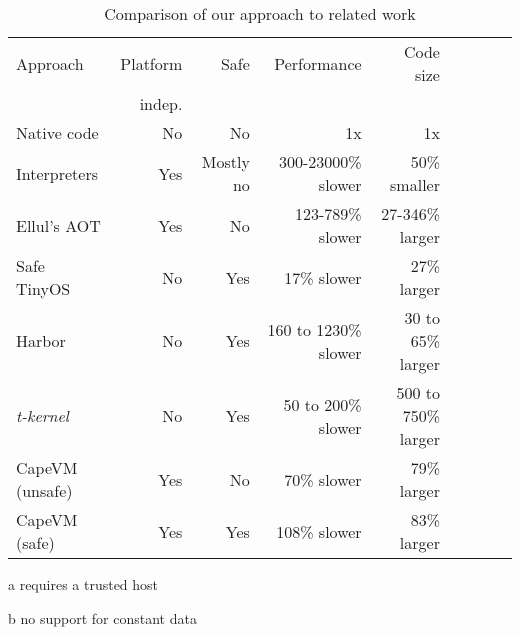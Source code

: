 \begin{table}
\caption{Comparison of our approach to related work}
\label{tbl-contribution-comparison}
    \begin{threeparttable}
    \begin{tabular}{lrrrrrrrr} %
    \toprule
    Approach        & Platform    & Safe               & Performance           & Code size                  \\
                    & indep.      &                    &                       &                            \\
    \midrule
    \midrule
    Native code     & No          & No                 & 1x                    & 1x                         \\
    Interpreters    & Yes         & Mostly no          & 300-23000\% slower    & ~50\% smaller \tnote{b}    \\
    Ellul's AOT     & Yes         & No                 & 123-789\% slower      & 27-346\% larger \tnote{b} \\
    Safe TinyOS     & No          & Yes \tnote{a}      & 17\% slower           & 27\% larger                \\
    Harbor          & No          & Yes                & 160 to 1230\% slower  & 30 to 65\% larger          \\
    \emph{t-kernel} & No          & Yes                & 50 to 200\% slower    & 500 to 750\% larger        \\
    CapeVM (unsafe) & Yes         & No                 & 70\% slower           & 79\% larger                \\ %
    CapeVM (safe)   & Yes         & Yes                & 108\% slower          & 83\% larger                \\ %
    \bottomrule
    \end{tabular}
    \begin{tablenotes}
        \item[a] requires a trusted host
        \item[b] no support for constant data
    \end{tablenotes}
    \end{threeparttable}
\end{table}
